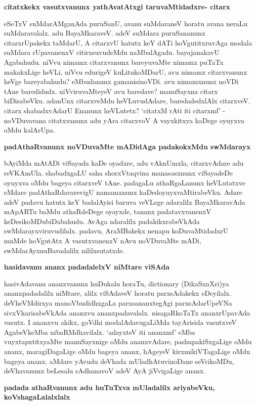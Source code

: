 \noindent
{\bf\large{citatxkekx vasutxvanunx yathAvatAtxgi taruvaMtidadxre- citarx}}\label{page200}

eSeTxV suMdarAMganAda puruSanU, avanu suMdaraneV horatu avana neraLu suMdaravalalx. adu BayaMkaraveV. adeV suMdara puruSananunx citarxrUpakekx taMdarU, A citarxvU hatutx keY dATi hoVgutitxruvAga modala suMdara rUpavanenxV citirxsuvudeMdu naMbalAgadu. bayajanakavU Agabahudu. niVvu nimamx citarxvanunx bareyuvaMte nimamx puTaTx makakxLige heVLi, niVvu edurigeV kuLitukoMDarU, avu nimamx citarxvanunx heVge bareyabahudu? eMbudanunx gamanisinoVDi. avu nimamxnunx noVDi tAne baredidudx. niVviruvaMteyeV avu baredave? manuSayxna citarx biDisabeVku. adanUnx citarxveMdu heVLuvudAdare, baredadedxlAlx citarxveV. citarx shabadxvAdarU Enanunx heVLutetx? `citatxM rAti iti citarxmf' - noVDuvavana citatxvanunx adu yAra citarxvoV A vayxkitxya kaDege oyuyxva oMdu kalArUpa.

\noindent
{\bf\large{padAthaRvanunx noVDuvaMte mADidAga padakokxMdu swMdarayx}}\label{page201}

bAyiMda mAtADi viSayada kaDe oyadxre, adu vAknUmxla, citarxvAdare adu reVKAmUla. shabadxgaLU saha shorxVtaqvina manasasxnunx viSayadeDe oyuyxva oMdu bageya citarxveV tAne. padagaLu athaRgaLanunx heVLutatxve eMdare padAthaRdavarevigU namamxnunx kaDedoyuyxvaMtirabeVku. Adare adeV padavu hatutx keY badalAyisi baruva veVLege adaralilx BayaMkaravAda mApARTu baMdu athaRdeDege oyayxde, tananx padatavxvanenxV keDesikoMDubiDabahudu. AvAga adaralilx padakikxrabeVkAda swMdarayxviruvudilalx. padavu, AraMBakekx nenapu koDuvaMtidadxrU muMde hoVgutAtx A vasutxvanenxV nAvu noVDuvaMte mADi, swMdarAyxnuBavadalilx nililxsutatxde.

\noindent
{\bf\large{hasidavanu ananx padadalelxV niMtare viSAda}}\label{page201}

hasivAdavanu ananxvanunx huDukalu horaTu, {\rm dictionary} (DikaSxnXri)ya ananxpadadalilx niMtare, alilx viSAdaveV horatu parxsAdakekx eDeyilalx. deVheVMdirxya manoVbudidhxgaLa parxsananxtegAgi parxsAdarUpeVNa sivxVkarisabeVkAda ananxvu ananxpadavalalx. nisagaRkoTaTx ananxrUpavAda vasutx. I ananxvu akikx, goVdhi modalAdavugaLiMda tayArisida vasutxveV AgabeVkeMba nibaRMdhavilalx. `adayxteV iti ananxmf' eMba vuyxtapxtitxyaMte manuSayxnige oMdu ananxvAdare, pashupakiSxgaLige oMdu ananx, maragiDagaLige oMdu bageya ananx, hAgeyeV kirxmikiVTagaLige oMdu bageya ananx. aMdare yAvudu deVhada mUladhAtuvinoDane seVrikoMDu, deVhavanunx beLesalu sAdhanavoV adeV AyA jiVvigaLige ananx.

\noindent
{\bf\large{padada athaRvanunx adu huTuTxva mUladalilx ariyabeVku, koVshagaLalalxlalx}}

